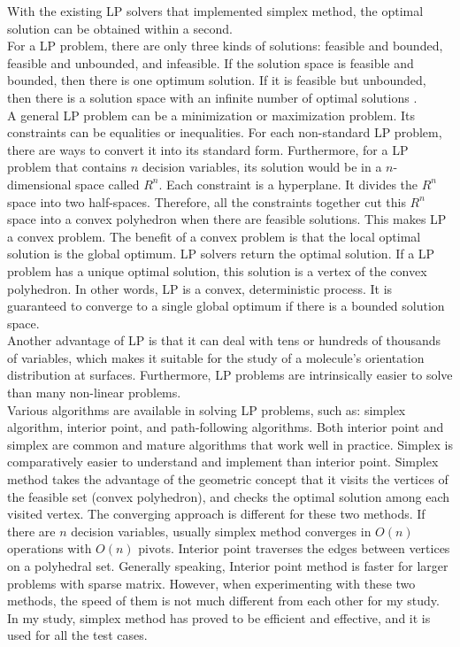 With the existing LP solvers that implemented simplex method, the optimal solution can be obtained within a second. \\

For a LP problem, there are only three kinds of solutions: feasible and bounded, feasible and unbounded, and infeasible. If the solution space is feasible and bounded, then there is one optimum solution. If it is feasible but unbounded, then there is a solution space with an infinite number of optimal solutions \cite{LP}. \\

A general LP problem can be a minimization or maximization problem. Its constraints can be equalities or inequalities. For each non-standard LP problem, there are ways to convert it into its standard form. Furthermore, for a LP problem that contains $n$ decision variables, its solution would be in a $n$-dimensional space called $R^{n}$. Each constraint is a hyperplane. It divides the $R^{n}$ space into two half-spaces. Therefore, all the constraints together cut this $R^{n}$ space into a convex polyhedron when there are feasible solutions. This makes LP a convex problem. The benefit of a convex problem is that the local optimal solution is the global optimum. LP solvers return the optimal solution. If a LP problem has a unique optimal solution, this solution is a vertex of the convex polyhedron. In other words, LP is a convex, deterministic process. It is guaranteed to converge to a single global optimum if there is a bounded solution space. \\

Another advantage of LP is that it can deal with tens or hundreds of thousands of variables, which makes it suitable for the study of a molecule's orientation distribution at surfaces. Furthermore, LP problems are intrinsically easier to solve than many non-linear problems. \\

Various algorithms are available in solving LP problems, such as: simplex algorithm, interior point, and path-following algorithms. Both interior point and simplex are common and mature algorithms that work well in practice. Simplex is comparatively easier to understand and implement than interior point. Simplex method takes the advantage of the geometric concept that it visits the vertices of the feasible set (convex polyhedron), and checks the optimal solution among each visited vertex. The converging approach is different for these two methods. If there are $n$ decision variables, usually simplex method converges in $O(n)$ operations with $O(n)$ pivots. Interior point traverses the edges between vertices on a polyhedral set. Generally speaking, Interior point method is faster for larger problems with sparse matrix. However, when experimenting with these two methods, the speed of them is not much different from each other for my study. In my study, simplex method has proved to be efficient and effective, and it is used for all the test cases. \\

